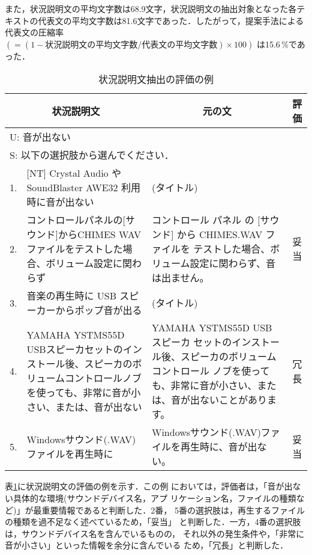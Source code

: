 また，状況説明文の平均文字数は68.9文字，状況説明文の抽出対象となった各テ
キストの代表文の平均文字数は81.6文字であった．したがって，提案手法による
代表文の圧縮率$(=(1-状況説明文の平均文字数/代表文の平均文字数) \times
100)$ は15.6\,\%であった．

\begin{table}
 \caption{状況説明文抽出の評価の例} \label{tab:状況説明文抽出の評価の例}
 \begin{center} \footnotesize
  \begin{tabular}{cp{5cm}|p{5cm}|c} \hline
   \multicolumn{2}{c}{状況説明文} & \multicolumn{1}{|c|}{元の文} &
   評価 \\ \hline
        \multicolumn{4}{l}{U: 音が出ない} \\
        \multicolumn{4}{l}{S: 以下の選択肢から選んでください．} \\ \hline
         1. & [NT] Crystal Audio や SoundBlaster AWE32 利用時に音が出ない
            & (タイトル)
            & \\
         2. & コントロールパネルの[サウンド]からCHIMES WAVファイルをテストした場合、ボリューム設定に関わらず
            & コントロール パネル の [サウンド] から CHIMES.WAV ファイルを テストした場合、ボリューム設定に関わらず、音は出ません。
            & 妥当 \\
         3. & 音楽の再生時に USB スピーカーからポップ音が出る
            & (タイトル)
            & \\
         4. & YAMAHA YSTMS55D USBスピーカセットのインストール後、スピーカのボリュームコントロールノブを使っても、非常に音が小さい、または、音が出ない
            & YAMAHA YSTMS55D USB スピーカ セットのインストール後、スピーカのボリューム コントロール ノブを使っても、非常に音が小さい、または、音が出ないことがあります。 
            & 冗長 \\
         5. & Windowsサウンド(.WAV)ファイルを再生時に
            & Windowsサウンド(.WAV)ファイルを再生時に、音が出ない。
            & 妥当 \\ \hline
  \end{tabular}
 \end{center}
\end{table}



表\ref{tab:状況説明文抽出の評価の例}に状況説明文の評価の例を示す．この例
においては，評価者は，「音が出ない具体的な環境(サウンドデバイス名，アプ
リケーション名，ファイルの種類など)」が最重要情報であると判断した．2番，
5番の選択肢は，再生するファイルの種類を過不足なく述べているため，「妥当」
と判断した．一方，4番の選択肢は，サウンドデバイス名を含んでいるものの，
それ以外の発生条件や，「非常に音が小さい」といった情報を余分に含んでいる
ため，「冗長」と判断した．

